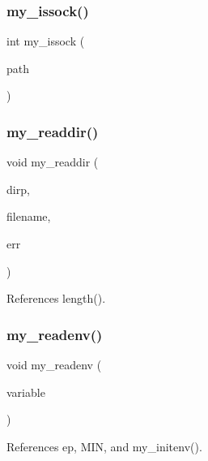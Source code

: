 \subsubsection{\texorpdfstring{my\+\_\+issock()}{my\_issock()}}
{\footnotesize\ttfamily int my\+\_\+issock (\begin{DoxyParamCaption}\item[{const char $\ast$}]{path }\end{DoxyParamCaption})}

\mbox{\label{C-M__system_8c_a56eb1f4025386fefa96810c8846a75ca}} 
\subsubsection{\texorpdfstring{my\+\_\+readdir()}{my\_readdir()}}
{\footnotesize\ttfamily void my\+\_\+readdir (\begin{DoxyParamCaption}\item[{D\+IR $\ast$}]{dirp,  }\item[{char $\ast$}]{filename,  }\item[{int $\ast$}]{err }\end{DoxyParamCaption})}



References length().

\mbox{\label{C-M__system_8c_a0114eece06797ba0c5e6f5948841501a}} 
\subsubsection{\texorpdfstring{my\+\_\+readenv()}{my\_readenv()}}
{\footnotesize\ttfamily void my\+\_\+readenv (\begin{DoxyParamCaption}\item[{char $\ast$}]{variable }\end{DoxyParamCaption})}



References ep, M\+IN, and my\+\_\+initenv().

\mbox{\label{C-M__system_8c_a93aa717690d60568cf019988f6434ba5}} 
